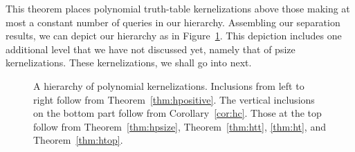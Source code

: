This theorem places polynomial truth-table kernelizations above those making at most a constant number of queries in our hierarchy.
Assembling our separation results, we can depict our hierarchy as in Figure~\ref{fig:kernel_hierarchy}.
This depiction includes one additional level that we have not discussed yet, namely that of psize kernelizations.
These kernelizations, we shall go into next.

\begin{figure}
  \centering
  \hspace*{-8em}  %
  \caption{
    A hierarchy of polynomial kernelizations.
    Inclusions from left to right follow from Theorem~\ref{thm:hpositive}.
    The vertical inclusions on the bottom part follow from Corollary~\ref{cor:hc}.
    Those at the top follow from Theorem~\ref{thm:hpsize}, Theorem~\ref{thm:htt}, \ref{thm:ht}, and Theorem~\ref{thm:htop}.
  }
  \label{fig:kernel_hierarchy}
\end{figure}

